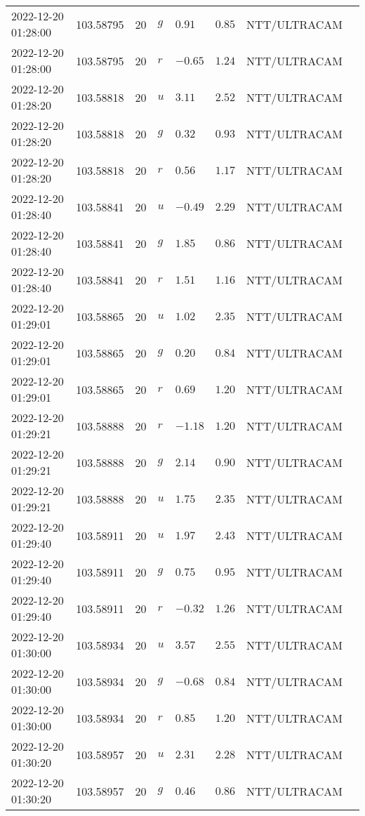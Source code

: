 \documentclass{nature_plusfigure}
\begin{document}
\begin{supplement}
\begin{center}
\begin{longtable}{llllllll}
2022-12-20 01:28:00 & 103.58795 & 20 & $g$ & $0.91$ & $0.85$ & NTT/ULTRACAM &  \\ 
2022-12-20 01:28:00 & 103.58795 & 20 & $r$ & $-0.65$ & $1.24$ & NTT/ULTRACAM &  \\ 
2022-12-20 01:28:20 & 103.58818 & 20 & $u$ & $3.11$ & $2.52$ & NTT/ULTRACAM &  \\ 
2022-12-20 01:28:20 & 103.58818 & 20 & $g$ & $0.32$ & $0.93$ & NTT/ULTRACAM &  \\ 
2022-12-20 01:28:20 & 103.58818 & 20 & $r$ & $0.56$ & $1.17$ & NTT/ULTRACAM &  \\ 
2022-12-20 01:28:40 & 103.58841 & 20 & $u$ & $-0.49$ & $2.29$ & NTT/ULTRACAM &  \\ 
2022-12-20 01:28:40 & 103.58841 & 20 & $g$ & $1.85$ & $0.86$ & NTT/ULTRACAM &  \\ 
2022-12-20 01:28:40 & 103.58841 & 20 & $r$ & $1.51$ & $1.16$ & NTT/ULTRACAM &  \\ 
2022-12-20 01:29:01 & 103.58865 & 20 & $u$ & $1.02$ & $2.35$ & NTT/ULTRACAM &  \\ 
2022-12-20 01:29:01 & 103.58865 & 20 & $g$ & $0.20$ & $0.84$ & NTT/ULTRACAM &  \\ 
2022-12-20 01:29:01 & 103.58865 & 20 & $r$ & $0.69$ & $1.20$ & NTT/ULTRACAM &  \\ 
2022-12-20 01:29:21 & 103.58888 & 20 & $r$ & $-1.18$ & $1.20$ & NTT/ULTRACAM &  \\ 
2022-12-20 01:29:21 & 103.58888 & 20 & $g$ & $2.14$ & $0.90$ & NTT/ULTRACAM &  \\ 
2022-12-20 01:29:21 & 103.58888 & 20 & $u$ & $1.75$ & $2.35$ & NTT/ULTRACAM &  \\ 
2022-12-20 01:29:40 & 103.58911 & 20 & $u$ & $1.97$ & $2.43$ & NTT/ULTRACAM &  \\ 
2022-12-20 01:29:40 & 103.58911 & 20 & $g$ & $0.75$ & $0.95$ & NTT/ULTRACAM &  \\ 
2022-12-20 01:29:40 & 103.58911 & 20 & $r$ & $-0.32$ & $1.26$ & NTT/ULTRACAM &  \\ 
2022-12-20 01:30:00 & 103.58934 & 20 & $u$ & $3.57$ & $2.55$ & NTT/ULTRACAM &  \\ 
2022-12-20 01:30:00 & 103.58934 & 20 & $g$ & $-0.68$ & $0.84$ & NTT/ULTRACAM &  \\ 
2022-12-20 01:30:00 & 103.58934 & 20 & $r$ & $0.85$ & $1.20$ & NTT/ULTRACAM &  \\ 
2022-12-20 01:30:20 & 103.58957 & 20 & $u$ & $2.31$ & $2.28$ & NTT/ULTRACAM &  \\ 
2022-12-20 01:30:20 & 103.58957 & 20 & $g$ & $0.46$ & $0.86$ & NTT/ULTRACAM &  \\ 

\end{longtable}
\end{center}
\end{supplement}
\end{document}
